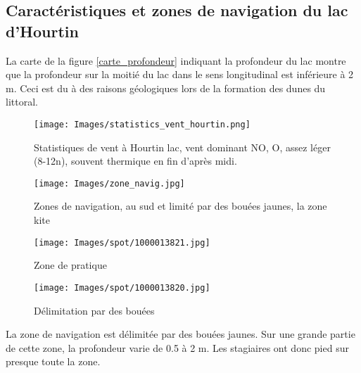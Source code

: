 \documentclass[11pt,a4paper]{report}
\begin{document}
\subsection{Caractéristiques  et zones de navigation du lac d'Hourtin}
La carte de la figure \ref{carte_profondeur} indiquant la 
profondeur du lac montre que la profondeur sur la moitié du lac
dans le sens longitudinal est inférieure à 2 m. 
Ceci est du à des raisons géologiques lors de la
formation des dunes du littoral.
\begin{figure}
\centering
\texttt{[image: Images/statistics\_vent\_hourtin.png]} 
\caption{Statistiques de vent à Hourtin lac, vent dominant NO, O, assez léger (8-12n), 
souvent thermique en fin d'après midi.\label{vent_stats}}
\end{figure}


\begin{figure}
\texttt{[image: Images/zone\_navig.jpg]}
\caption{Zones de navigation, au sud et limité par des bouées jaunes,
 la zone kite\label{zones_nav}} 
\end{figure}

\begin{figure}
\begin{minipage}{0.4\textwidth}
\texttt{[image: Images/spot/1000013821.jpg]} 
\caption{Zone de pratique}
\end{minipage}
\hfill
\begin{minipage}{0.4\textwidth}
\texttt{[image: Images/spot/1000013820.jpg]} 
\caption{Délimitation par des bouées}
\end{minipage}
\end{figure}
La zone de navigation est délimitée par des bouées jaunes.
Sur une grande partie de cette zone, la profondeur varie de 0.5 à 2 m.
Les stagiaires ont donc pied sur presque toute la zone.
\end{document}
